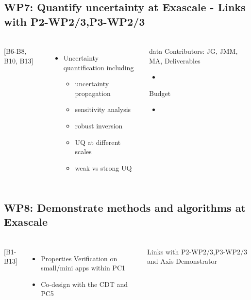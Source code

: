 \subsection{WP7: Quantify uncertainty at Exascale - Links with P2-WP2/3,P3-WP2/3 }
\begin{frame}
  \frametitle{\insertsectionhead}
  \framesubtitle{\insertsubsectionhead}
  \begin{columns}
    [B6-B8, B10, B13]
    \begin{itemize}
      \item Uncertainty quantification including 
      \begin{itemize}
        \item uncertainty propagation
        \item sensitivity analysis
        \item robust inversion
        \item UQ at different scales
        \item weak vs strong UQ
      \end{itemize}
    \end{itemize}
    \begin{alertblock}{data}
      Contributors: JG, JMM, MA, 
      Deliverables
        \begin{itemize}
          \item 
        \end{itemize}
        Budget
        \begin{itemize}
          \item 
        \end{itemize}
    \end{alertblock}
  \end{columns}
\end{frame}

\subsection{WP8: Demonstrate methods and algorithms at Exascale}
\begin{frame}
  \frametitle{\insertsectionhead}
  \framesubtitle{\insertsubsectionhead}

  \begin{columns}
    [B1-B13]
    \begin{itemize}
      \item Properties Verification on small/mini apps within PC1
      \item Co-design with the CDT and PC5
    \end{itemize}
    Links with P2-WP2/3,P3-WP2/3 and Axis Demonstrator
  \end{columns}

\end{frame}
